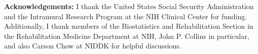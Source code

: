 \documentclass{IOS-Book-Article}
\begin{document}
\textbf{Acknowledgements:} I thank the United States Social Security Administration and the Intramural Research Program at the NIH Clinical Center for funding. Additionally, I thank members of the Biostatistics and Rehabilitation Section in the Rehabilitation Medicine Department at NIH, John P. Collins in particular, and also Carson Chow at NIDDK for helpful discussions.



 
\end{document}
